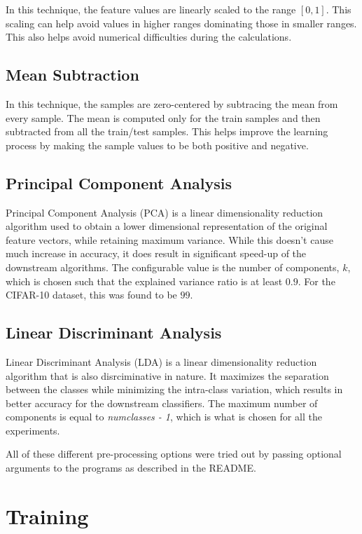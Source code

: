 \documentclass[12pt]{article}
\begin{document}
In this technique, the feature values are linearly scaled to the range $[0, 1]$. This scaling can help avoid values in higher ranges dominating those in smaller ranges. This also helps avoid numerical difficulties during the calculations.

\subsection*{Mean Subtraction}

In this technique, the samples are zero-centered by subtracing the mean from every sample. The mean is computed only for the train samples and then subtracted from all the train/test samples. This helps improve the learning process by making the sample values to be both positive and negative.

\subsection*{Principal Component Analysis}

Principal Component Analysis (PCA) is a linear dimensionality reduction algorithm used to obtain a lower dimensional representation of the original feature vectors, while retaining maximum variance. While this doesn't cause much increase in accuracy, it does result in significant speed-up of the downstream algorithms. The configurable value is the number of components, $k$, which is chosen such that the explained variance ratio is at least $0.9$. For the CIFAR-10 dataset, this was found to be $99$.

\subsection*{Linear Discriminant Analysis}
Linear Discriminant Analysis (LDA) is a linear dimensionality reduction algorithm that is also disrciminative in nature. It maximizes the separation between the classes while minimizing the intra-class variation, which results in better accuracy for the downstream classifiers. The maximum number of components is equal to \textit{numclasses - 1}, which is what is chosen for all the experiments.

\vspace{1em}
\noindent All of these different pre-processing options were tried out by passing optional arguments to the programs as described in the README.

\section*{Training}
\end{document}
